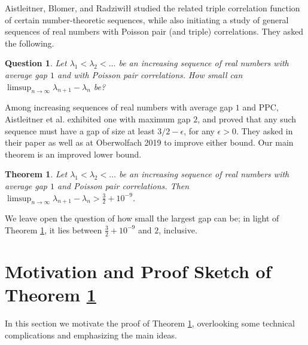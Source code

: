 \documentclass[12pt]{amsart}
\newtheorem{theorem}{Theorem}
\newtheorem*{question}{Question}
\theoremstyle{definition}
\newcommand{\vs}{\vspace{3mm}}
\newcommand{\lam}{\lambda}
\begin{document}
\vs

Aistleitner, Blomer, and Radziwi\l\l \hspace{0.5mm} \cite{abr} studied the related triple correlation function of certain number-theoretic sequences, while also initiating a study of general sequences of real numbers with Poisson pair (and triple) correlations. They asked the following.

\vspace{1.5mm}

\begin{question}
Let $\lam_1 < \lam_2 < \dots$ be an increasing sequence of real numbers with average gap $1$ and with Poisson pair correlations. How small can $\limsup_{n \to \infty} \lam_{n+1}-\lam_n$ be?
\end{question}

\vspace{1.5mm}

Among increasing sequences of real numbers with average gap $1$ and PPC, Aistleitner et al. exhibited one with maximum gap $2$, and proved that any such sequence must have a gap of size at least $3/2-\epsilon$, for any $\epsilon > 0$. They asked in their paper \cite{abr} as well as at Oberwolfach 2019 \cite{green} to improve either bound. Our main theorem is an improved lower bound. 

\vspace{2mm}

\begin{theorem}\label{main}
Let $\lam_1 < \lam_2 < \dots$ be an increasing sequence of real numbers with average gap $1$ and Poisson pair correlations. Then $\limsup_{n \to \infty} \lam_{n+1}-\lam_n > \frac{3}{2}+10^{-9}$. 
\end{theorem}

\vspace{1.5mm}

We leave open the question of how small the largest gap can be; in light of Theorem \ref{main}, it lies between $\frac{3}{2}+10^{-9}$ and $2$, inclusive. 




\vs

\section{Motivation and Proof Sketch of Theorem \ref{main}}\label{motivation}

In this section we motivate the proof of Theorem \ref{main}, overlooking some technical complications and emphasizing the main ideas. 
\end{document}
